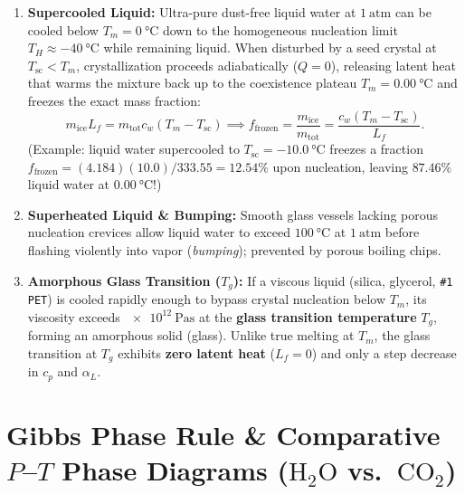\begin{itemize}
  \begin{enumerate}
    \item \textbf{Supercooled Liquid:} Ultra-pure dust-free liquid water at $\SI{1}{\text{atm}}$ can be cooled below $T_m = \SI{0}{\celsius}$ down to the homogeneous nucleation limit $T_H \approx \SI{-40}{\celsius}$ while remaining liquid. When disturbed by a seed crystal at $T_{\mathrm{sc}} < T_m$, crystallization proceeds adiabatically ($Q = 0$), releasing latent heat that warms the mixture back up to the coexistence plateau $T_m = \SI{0.00}{\celsius}$ and freezes the exact mass fraction:
    \begin{equation}\label{eq:05:supercool}
      m_{\mathrm{ice}} L_f = m_{\mathrm{tot}} c_w (T_m - T_{\mathrm{sc}}) \implies
      f_{\mathrm{frozen}} = \frac{m_{\mathrm{ice}}}{m_{\mathrm{tot}}} = \frac{c_w(T_m - T_{\mathrm{sc}})}{L_f}.
    \end{equation}
    (Example: liquid water supercooled to $T_{\mathrm{sc}} = -\SI{10.0}{\celsius}$ freezes a fraction $f_{\mathrm{frozen}} = (4.184)(10.0)/333.55 = \mathbf{12.54\%}$ upon nucleation, leaving $87.46\%$ liquid water at $\SI{0.00}{\celsius}$!)
    \item \textbf{Superheated Liquid \& Bumping:} Smooth glass vessels lacking porous nucleation crevices allow liquid water to exceed $\SI{100}{\celsius}$ at $\SI{1}{\text{atm}}$ before flashing violently into vapor (\emph{bumping}); prevented by porous boiling chips.
    \item \textbf{Amorphous Glass Transition ($T_g$):} If a viscous liquid (silica, glycerol, \texttt{\#1 PET}) is cooled rapidly enough to bypass crystal nucleation below $T_m$, its viscosity exceeds $\SI{e12}{\pascal\second}$ at the \textbf{glass transition temperature} $T_g$, forming an amorphous solid (glass). Unlike true melting at $T_m$, the glass transition at $T_g$ exhibits \textbf{zero latent heat} ($L_f = 0$) and only a step decrease in $c_p$ and $\alpha_L$.
  \end{enumerate}
\end{itemize}

\section{Gibbs Phase Rule \& Comparative $P$--$T$ Phase Diagrams ($\mathrm{H_2O}$ vs.\ $\mathrm{CO_2}$)}
\label{sec:05.2}

